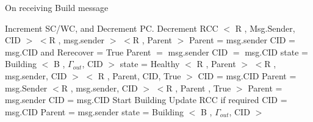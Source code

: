 	
\begin{algorithm}[H]
\caption{On receiving Build message}
\label{Build message received}
\scriptsize
\begin{algorithmic}[1]
\State Increment SC/WC, and Decrement PC.
    \State Decrement RCC
  \EndIf
{}
	\State $<$ R , Msg.Sender, CID $>$
		\State $<$R , msg.sender $>$
	\Else
			\State $<$R , Parent $>$
		\EndIf
		\State Parent = msg.sender
		\State CID = msg.CID and Rerecover = True
	\EndIf
{}
	\State Parent $=$ msg.sender
	\State CID $=$ msg.CID
		\State state = Building
		\State $<$ B , $\Gamma_{out}$, CID $>$
	\Else
		\State state = Healthy
		\State $<$ R , Parent $>$
	\EndIf
{}
		\State $<$R , msg.sender, CID $>$
	\Else
			\State $<$ R , Parent, CID, True $>$
		\EndIf
		\State CID = msg.CID
		\State Parent = msg.Sender
	\EndIf
{}
		\State $<$R , msg.sender, CID $>$
	\Else
			\State $<$R , Parent , True $>$
		\EndIf
		\State Parent = msg.sender
		\State CID = msg.CID
	\EndIf
  \State Start Building
	\State Update RCC if required
	\State CID = msg.CID
	\State Parent = msg.sender
	\State state = Building
	\State $<$ B , $\Gamma_{out}$, CID $>$
\EndIf
\EndProcedure
\end{algorithmic}
\end{algorithm}	



